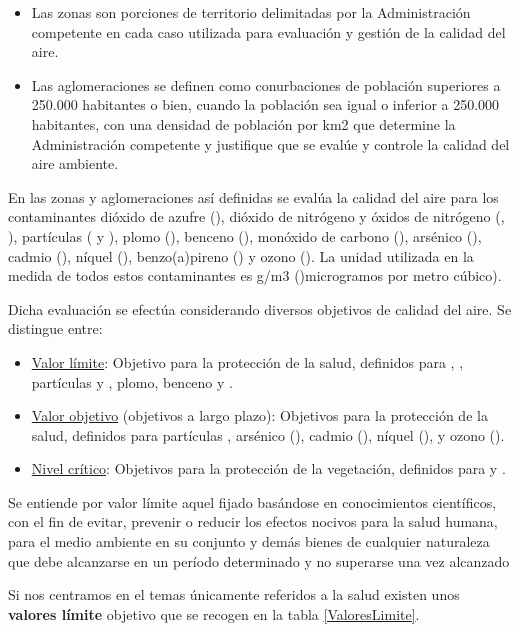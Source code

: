 \begin{itemize}
	\item Las zonas son porciones de territorio delimitadas por la Administración competente
	en cada caso utilizada para evaluación y gestión de la calidad del aire.
	\item Las aglomeraciones se definen como conurbaciones de población superiores a 250.000	habitantes o bien, cuando la población sea igual o inferior a 250.000 habitantes, con	una densidad de población por km2 que determine la Administración competente y
	justifique que se evalúe y controle la calidad del aire ambiente.
\end{itemize}

En las zonas y aglomeraciones así definidas se evalúa la calidad del aire para los contaminantes dióxido de azufre (), dióxido de nitrógeno y óxidos de nitrógeno (, ), partículas ( y ), plomo (), benceno (), monóxido de carbono (), arsénico (), cadmio (), níquel (), benzo(a)pireno () y ozono (). La unidad utilizada en la medida de todos estos contaminantes es \textmugreek g/m3 ()microgramos por metro cúbico).

Dicha evaluación se efectúa considerando diversos objetivos de calidad del aire. 
Se distingue entre:
\begin{itemize}
	\item \underline{Valor límite}: Objetivo para la protección de la salud, definidos para , ,
			partículas  y , plomo, benceno y .
	\item \underline{Valor objetivo} (objetivos a largo plazo): Objetivos para la protección de la salud,	definidos para partículas , arsénico (), cadmio (), níquel (),  y ozono  ().
	\item	\underline{Nivel crítico}: Objetivos para la protección de la vegetación, definidos para  y
	.
\end{itemize}

Se entiende por valor límite aquel fijado basándose en conocimientos científicos, con el
fin de evitar, prevenir o reducir los efectos nocivos para la salud humana, para el medio
ambiente en su conjunto y demás bienes de cualquier naturaleza que debe alcanzarse en
un período determinado y no superarse una vez alcanzado

Si nos centramos en el temas únicamente referidos a la salud existen unos \textbf{valores límite} objetivo que se recogen en la tabla \ref{ValoresLimite}.
 
